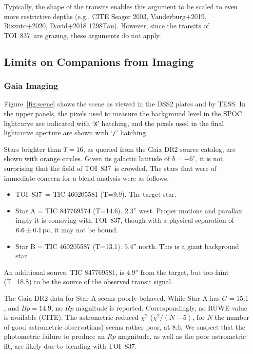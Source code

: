 \documentclass[12pt,twocolumn,tighten]{aastex62}
\newcommand{\tn}{TOI~837} %
\begin{document}
Typically, the shape of the transits enables this argument to be scaled to even
more restrictive depths (e.g., CITE Seager 2003, Vanderburg+2019,
Rizzuto+2020, David+2018 1298Tau).  However, since the transits of
\tn\ are grazing, these arguments do not apply.

\subsection{Limits on Companions from Imaging}

\subsubsection{Gaia Imaging}
Figure~\ref{fig:scene} shows the scene as viewed in the DSS2 plates
and by TESS.  In the upper panels, the pixels used to measure the
background level in the SPOC lightcurve are indicated with
`\texttt{X}' hatching, and the pixels used in the final lightcurve
aperture are shown with `\texttt{/}' hatching.

Stars brighter than $T=16$, as queried from the Gaia DR2 source
catalog, are shown with orange circles.  Given its galactic latitude
of $b=-6^\circ$, it is not surprising that the field of \tn\ is
crowded.  The stars that were of immediate concern for a blend
analysis were as follows.
\begin{itemize}
  \item \tn\ = TIC 460205581 (T=9.9). The target star.
  \item Star A = TIC 847769574 (T=14.6). $2.3$'' west. Proper motions
    and parallax imply it is comoving with \tn, though with a physical
    separation of $6.6\pm 0.1\,{\rm pc}$, it may not be bound.
  \item Star B = TIC 460205587 (T=13.1). $5.4$'' north.  This is a
    giant background star.
\end{itemize}
An additional source, TIC 847769581, is $4.9$'' from the target, but
too faint (T=18.8) to be the source of the observed transit signal.

The Gaia DR2 data for Star A seems poorly behaved.  While
Star A has $G=15.1$, and $Bp=14.9$, no $Rp$ magnitude is reported.
Correspondingly, no RUWE value is available (CITE).  The astrometric
reduced $\chi^2$ ($\chi^2 / (N-5)$, for $N$ the number of good
astrometric observations) seems rather poor, at $8.6$.  We suspect
that the photometric failure to produce an $Rp$ magnitude, as well as
the poor astrometric fit, are likely due to blending with \tn.
\end{document}
